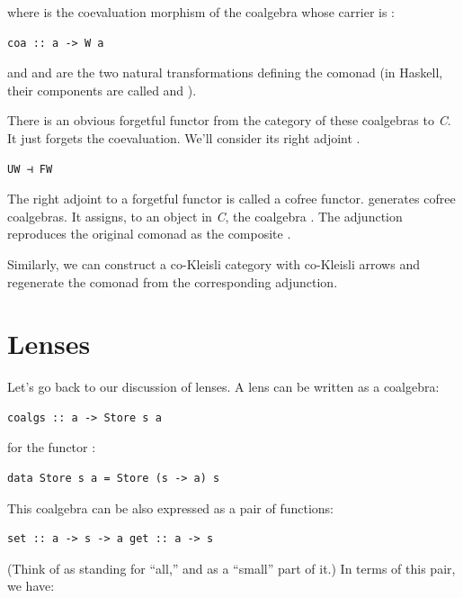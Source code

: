 where  is the coevaluation morphism of the coalgebra whose
carrier is :

\begin{verbatim}
coa :: a -> W a
\end{verbatim}

and  and  are the two natural transformations
defining the comonad (in Haskell, their components are called
 and ).

There is an obvious forgetful functor  from the category of
these coalgebras to \emph{C}. It just forgets the coevaluation. We'll
consider its right adjoint .

\begin{verbatim}
UW ⊣ FW
\end{verbatim}

The right adjoint to a forgetful functor is called a cofree functor.
 generates cofree coalgebras. It assigns, to an object
 in \emph{C}, the coalgebra . The
adjunction reproduces the original comonad as the composite
.

Similarly, we can construct a co-Kleisli category with co-Kleisli arrows
and regenerate the comonad from the corresponding adjunction.

\section{Lenses}\label{lenses}

Let's go back to our discussion of lenses. A lens can be written as a
coalgebra:

\begin{verbatim}
coalgs :: a -> Store s a
\end{verbatim}

for the functor :

\begin{verbatim}
data Store s a = Store (s -> a) s
\end{verbatim}

This coalgebra can be also expressed as a pair of functions:

\begin{verbatim}
set :: a -> s -> a get :: a -> s
\end{verbatim}

(Think of  as standing for ``all,'' and  as a
``small'' part of it.) In terms of this pair, we have:


